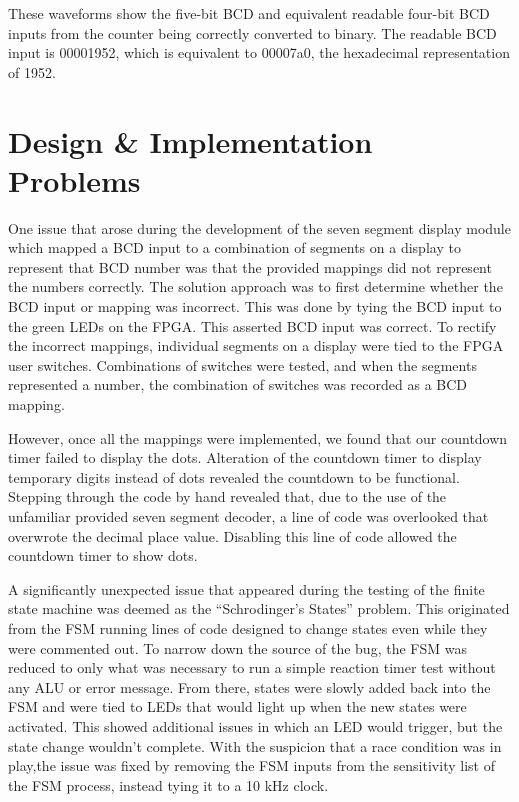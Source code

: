 \documentclass[11pt]{article}
\begin{document}
These waveforms show the five-bit BCD and equivalent readable four-bit BCD inputs from the counter being correctly converted to binary. The readable BCD input is 00001952, which is equivalent to 00007a0, the hexadecimal representation of 1952.

\section{Design \& Implementation Problems}

One issue that arose during the development of the seven segment display module which mapped a BCD input to a combination of segments on a display to represent that BCD number was that the provided mappings did not represent the numbers correctly. The solution approach was to first determine whether the BCD input or mapping was incorrect. This was done by tying the BCD input to the green LEDs on the FPGA. This asserted BCD input was correct. To rectify the incorrect mappings, individual segments on a display were tied to the FPGA user switches. Combinations of switches were tested, and when the segments represented a number, the combination of switches was recorded as a BCD mapping.

However, once all the mappings were implemented, we found that our countdown timer failed to display the dots. Alteration of the countdown timer to display temporary digits instead of dots revealed the countdown to be functional. Stepping through the code by hand revealed that, due to the use of the unfamiliar provided seven segment decoder, a line of code was overlooked that overwrote the decimal place value. Disabling this line of code allowed the countdown timer to show dots.

A significantly unexpected issue that appeared during the testing of the finite state machine was deemed as the ``Schrodinger's States'' problem. This originated from the FSM running lines of code designed to change states even while they were commented out. To narrow down the source of the bug, the FSM was reduced to only what was necessary to run a simple reaction timer test without any ALU or error message. From there, states were slowly added back into the FSM and were tied to LEDs that would light up when the new states were activated. This showed additional issues in which an LED would trigger, but the state change wouldn't complete. With the suspicion that a race condition was in play,the issue was fixed by removing the FSM inputs from the sensitivity list of the FSM process, instead tying it to a 10 kHz clock.
\end{document}

